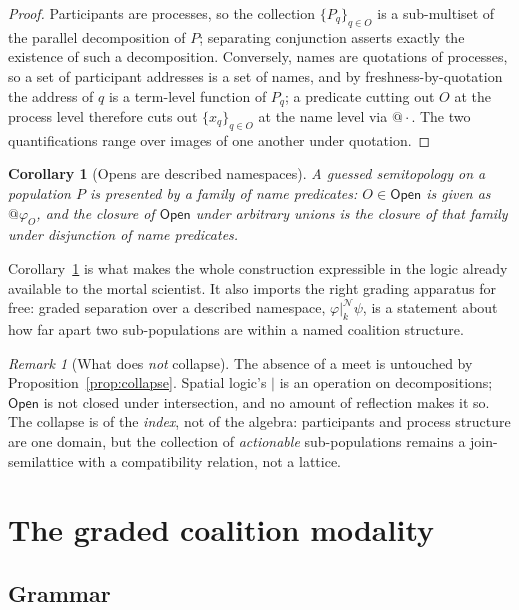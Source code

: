 \documentclass[11pt,a4paper]{article}
\makeatletter
\theoremstyle{plain}
\newtheorem{corollary}[theorem]{Corollary}
\theoremstyle{definition}
\theoremstyle{remark}
\newtheorem{remark}[theorem]{Remark}
\newcommand{\Open}{\mathsf{Open}}
\newcommand{\Nsp}{\mathcal{N}}
\newcommand{\qq}[1]{@#1}
\newcommand{\sep}[2]{\mathbin{\big|^{#1}_{#2}}}
\makeatother
\begin{document}
\begin{proof}
Participants are processes, so the collection $\{P_q\}_{q\in O}$ is a
sub-multiset of the parallel decomposition of $P$; separating conjunction
asserts exactly the existence of such a decomposition. Conversely, names are
quotations of processes, so a set of participant addresses is a set of names,
and by freshness-by-quotation \cite[\S3]{scientist} the address of $q$ is a
term-level function of $P_q$; a predicate cutting out $O$ at the process level
therefore cuts out $\{x_q\}_{q\in O}$ at the name level via $\qq{\cdot}$. The
two quantifications range over images of one another under quotation.
\end{proof}

\begin{corollary}[Opens are described namespaces]\label{cor:opens}
A guessed semitopology on a population $P$ is presented by a family of name
predicates: $O\in\Open$ is given as $\qq{\varphi_O}$, and the closure of
$\Open$ under arbitrary unions is the closure of that family under disjunction
of name predicates.
\end{corollary}

Corollary~\ref{cor:opens} is what makes the whole construction expressible in
the logic already available to the mortal scientist. It also imports the right
grading apparatus for free: graded separation over a described namespace,
$\varphi \sep{\Nsp}{k}\psi$, is a statement about how far apart two
sub-populations are within a named coalition structure.

\begin{remark}[What does \emph{not} collapse]
The absence of a meet is untouched by Proposition~\ref{prop:collapse}. Spatial
logic's $\mid$ is an operation on decompositions; $\Open$ is not closed under
intersection, and no amount of reflection makes it so. The collapse is of the
\emph{index}, not of the algebra: participants and process structure are one
domain, but the collection of \emph{actionable} sub-populations remains a
join-semilattice with a compatibility relation, not a lattice.
\end{remark}

\section{The graded coalition modality}\label{sec:modality}

\subsection{Grammar}
\end{document}
